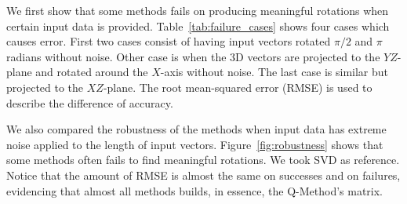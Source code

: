 \documentclass{birkjour}
\numberwithin{equation}{section}
\begin{document}
We first show that some methods fails on producing meaningful rotations when certain input data is provided. Table~\ref{tab:failure_cases} shows four cases which causes error. First two cases consist of having input vectors rotated $\pi/2$ and $\pi$ radians without noise. Other case is when the 3D vectors are projected to the $YZ$-plane and rotated  around the $X$-axis without noise. The last case is similar but projected to the $XZ$-plane. The root mean-squared error (RMSE) is used to describe the difference of accuracy.

 \begin{table} [H]
 \centering
 \caption{RMSE of one million vector alignments of a thousand input vectors without noise. Some methods failed when 3D vectors were rotated $\pi/2$ and $\pi$  and when vectors are projected to the coordinate planes}  
 \label{tab:failure_cases}
 \end{table}

We also compared the robustness of the methods when input data has extreme noise applied to the length of input vectors. Figure~\ref{fig:robustness} shows that some methods often fails to find meaningful rotations. We took SVD as reference. Notice that the amount of RMSE is almost the same on successes and on failures, evidencing that almost all methods builds, in essence, the Q-Method's matrix.
 
\end{document}
